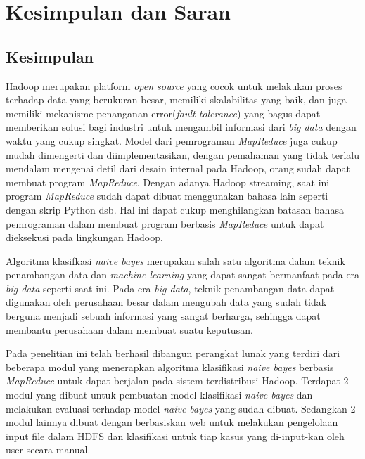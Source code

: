 \chapter{Kesimpulan dan Saran}

\section{Kesimpulan}

Hadoop merupakan platform \textit{open source} yang cocok untuk melakukan proses terhadap data yang berukuran besar, memiliki skalabilitas yang baik, dan juga memiliki mekanisme penanganan error(\textit{fault tolerance}) yang bagus dapat memberikan solusi bagi industri untuk mengambil informasi dari \textit{big data} dengan waktu yang cukup singkat. Model dari pemrograman \textit{MapReduce} juga cukup mudah dimengerti dan diimplementasikan, dengan pemahaman yang tidak terlalu mendalam mengenai detil dari desain internal pada Hadoop, orang sudah dapat membuat program \textit{MapReduce}. Dengan adanya Hadoop streaming, saat ini program \textit{MapReduce} sudah dapat dibuat menggunakan bahasa lain seperti dengan skrip Python dsb. Hal ini dapat cukup menghilangkan batasan bahasa pemrograman dalam membuat program berbasis \textit{MapReduce} untuk dapat dieksekusi pada lingkungan Hadoop.

Algoritma klasifkasi \textit{naive bayes} merupakan salah satu algoritma dalam teknik penambangan data dan \textit{machine learning} yang dapat sangat bermanfaat pada era \textit{big data} seperti saat ini. Pada era \textit{big data}, teknik penambangan data dapat digunakan oleh perusahaan besar dalam mengubah data yang sudah tidak berguna menjadi sebuah informasi yang sangat berharga, sehingga dapat membantu perusahaan dalam membuat suatu keputusan.

Pada penelitian ini telah berhasil dibangun perangkat lunak yang terdiri dari beberapa modul yang menerapkan algoritma klasifikasi \textit{naive bayes} berbasis \textit{MapReduce} untuk dapat berjalan pada sistem terdistribusi Hadoop. Terdapat 2 modul yang dibuat untuk pembuatan model klasifikasi \textit{naive bayes} dan melakukan evaluasi terhadap model \textit{naive bayes} yang sudah dibuat. Sedangkan 2 modul lainnya dibuat dengan berbasiskan web untuk melakukan pengelolaan input file dalam HDFS dan klasifikasi untuk tiap kasus yang di-input-kan oleh user secara manual.


